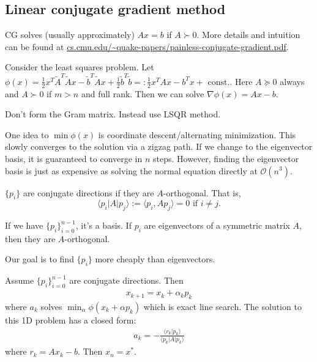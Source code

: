 \documentclass[class=article,crop=false]{standalone}
\begin{document}
\newpage
\subsection{Linear conjugate gradient method}
CG solves (usually approximately) $ Ax =b$ if  $ A \succ 0$. More details and intuition can be found at \url{cs.cmu.edu/~quake-papers/painless-conjugate-gradient.pdf}.

\begin{eg}
	Consider the least squares problem. Let $ \phi(x) = \frac{1}{2} x^{T} \widetilde{ A}^{T} \widetilde{ A}x - \widetilde{ b}^{T} \widetilde{ A}x + \frac{1}{2} \widetilde{ b}^{T}\widetilde{ b} =: \frac{1}{2} x^{T} A x - b^{T} x + \text{ const.} $. Here $ A \succeq 0$ always and $ A \succ 0$ if $ m>n$ and full rank. Then we can solve  $ \nabla \phi(x) = Ax-b$.
	\begin{note}
	Don't form the Gram matrix. Instead use LSQR method.
	\end{note}

	One idea to $ \min \phi(x)$ is coordinate descent/alternating minimization. This slowly converges to the solution via a zigzag path. If we change to the eigenvector basis, it is guaranteed to converge in $ n$ steps. However, finding the eigenvector basis is just as expensive as solving the normal equation directly at  $ \mathcal{ O}(n^3)$.
\begin{defn}
$ \{p_i\} $ are conjugate directions if they are $ A$-orthogonal. That is, 
\[
\langle p_i |A|p_j \rangle := \langle p_i, A p_j \rangle = 0 \text{ if } i\neq j 
.\] 
\end{defn}

\begin{note}
If we have $ \{p_i\}_{i=0}^{n-1} $, it's a basis. If $ p_i$ are eigenvectors of a symmetric matrix  $ A$, then they are  $ A$-orthogonal.
\end{note}

Our goal is to find $ \{p_i\} $ more cheaply than eigenvectors.
\end{eg}

\begin{thm}
Assume $ \{p_i\}_{i=0}^{n-1} $ are conjugate directions. Then
\begin{align*}
	x_{k+1} = x_k + \alpha_k p_k 
\end{align*}
where $ a_k$ solves $ \min_{\alpha} \phi(x_k + \alpha p_k)$ which is exact line search. The solution to this 1D problem has a closed form:
\begin{align*}
	a_k = - \frac{\langle r_k | p_k \rangle}{ \langle p_k|A|p_k \rangle}
\end{align*}
where $ r_k = A x_k-b$. Then $ x_n = x^* $.
\end{thm}
\end{document}
